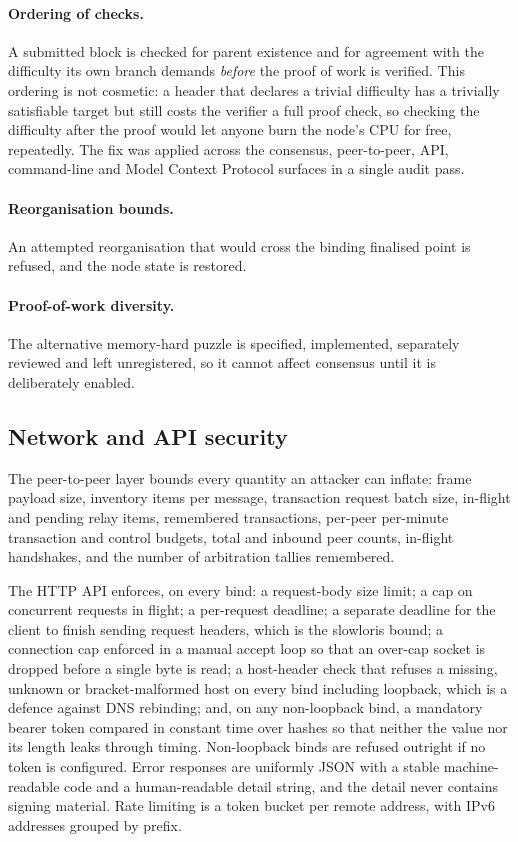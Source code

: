 \documentclass{article}
\begin{document}
\paragraph{Ordering of checks.} A submitted block is checked for parent
existence and for agreement with the difficulty its own branch demands
\emph{before} the proof of work is verified. This ordering is not cosmetic: a
header that declares a trivial difficulty has a trivially satisfiable target
but still costs the verifier a full proof check, so checking the difficulty
after the proof would let anyone burn the node's CPU for free, repeatedly. The
fix was applied across the consensus, peer-to-peer, API, command-line and
Model Context Protocol surfaces in a single audit pass.

\paragraph{Reorganisation bounds.} An attempted reorganisation that would cross
the binding finalised point is refused, and the node state is restored.

\paragraph{Proof-of-work diversity.} The alternative memory-hard puzzle is
specified, implemented, separately reviewed and left unregistered, so it
cannot affect consensus until it is deliberately enabled.

\subsection{Network and API security}

The peer-to-peer layer bounds every quantity an attacker can inflate: frame
payload size, inventory items per message, transaction request batch size,
in-flight and pending relay items, remembered transactions, per-peer per-minute
transaction and control budgets, total and inbound peer counts, in-flight
handshakes, and the number of arbitration tallies remembered.

The HTTP API enforces, on every bind: a request-body size limit; a cap on
concurrent requests in flight; a per-request deadline; a separate deadline for
the client to finish sending request headers, which is the slowloris bound; a
connection cap enforced in a manual accept loop so that an over-cap socket is
dropped before a single byte is read; a host-header check that refuses a
missing, unknown or bracket-malformed host on every bind including loopback,
which is a defence against DNS rebinding; and, on any non-loopback bind, a
mandatory bearer token compared in constant time over hashes so that neither
the value nor its length leaks through timing. Non-loopback binds are refused
outright if no token is configured. Error responses are uniformly JSON with a
stable machine-readable code and a human-readable detail string, and the detail
never contains signing material. Rate limiting is a token bucket per remote
address, with IPv6 addresses grouped by prefix.
\end{document}
